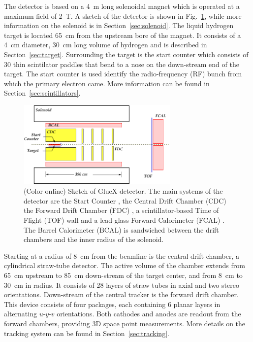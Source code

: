 The \gx{} detector is based on a 4~m long solenoidal magnet which is operated at a maximum field of 2~T. A sketch of the detector is shown in Fig.~\ref{fig:gluexsketch}, while more information on the solenoid is in Section~\ref{sec:solenoid}. The liquid hydrogen target is located 65~cm from the upstream bore of the magnet. It consists of a 4~cm diameter, 30~cm long volume of hydrogen and is described in Section~\ref{sec:target}. Surrounding the target is the start counter which consists of 30 thin scintilator paddles that bend to a nose on the down-stream end of the target. The start counter is used identify the radio-frequency (RF) bunch from which the primary electron came. More information can be found in Section~\ref{sec:scintillators}. 
\begin{figure}[htbp]\centering
\includegraphics[width=0.7\textwidth]{figures/GlueX_Sketch.pdf}  
\caption{\label{fig:gluexsketch} (Color online)         
Sketch of GlueX detector.  The main systems of the detector are the Start Counter \cite{Pooser:2019rhu}, the Central Drift Chamber (CDC) \cite{VanHaarlem:2010yq} the Forward Drift Chamber (FDC) \cite{Pentchev2017281}, a scintillator-based Time of Flight (TOF) wall and a lead-glass Forward Calorimeter (FCAL) \cite{MORIYA201360}. The Barrel Calorimeter (BCAL) is sandwiched between the drift chambers and the inner radius of the solenoid.}   
\end{figure}

Starting at a radius of 8~cm from the beamline is the central drift chamber, a cylindrical straw-tube detector. The active volume of the chamber extends from 65~cm upstream to 85~cm down-stream of the target center, and from 8~cm to 30~cm in radius. It consists of 28 layers of straw tubes in axial and two stereo orientations. Down-stream of the central tracker is the forward drift chamber. This device consists of four packages, each containing 6 planar layers in alternating $u$-$y$-$v$ orientations. Both cathodes and anodes are readout from the forward chambers, providing 3D space point measurements. More details on the tracking system can be found in Section~\ref{sec:tracking}. 

